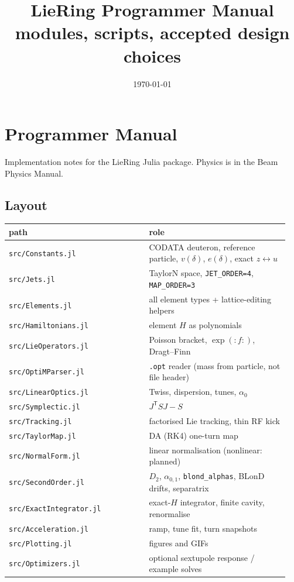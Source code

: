\documentclass[11pt,a4paper]{article}
\title{LieRing Programmer Manual\\\large modules, scripts, accepted design choices}
\date{\today}
\begin{document}
\maketitle
\tableofcontents
\clearpage
\section{Programmer Manual}

Implementation notes for the LieRing Julia package. Physics is in the
Beam Physics Manual.

\subsection{Layout}

\begin{center}\small\begin{tabular}{p{0.475\linewidth}p{0.475\linewidth}}\hline
\textbf{path} & \textbf{role}\\\hline
\texttt{src/Constants.jl} & CODATA deuteron, reference particle, $v(\delta)$, $e(\delta)$, exact $z\leftrightarrow u$\\
\texttt{src/Jets.jl} & TaylorN space, \texttt{JET\_ORDER=4}, \texttt{MAP\_ORDER=3}\\
\texttt{src/Elements.jl} & all element types + lattice-editing helpers\\
\texttt{src/Hamiltonians.jl} & element $H$ as polynomials\\
\texttt{src/LieOperators.jl} & Poisson bracket, $\exp(:f:)$, Dragt–Finn\\
\texttt{src/OptiMParser.jl} & \texttt{.opt} reader (mass from particle, not file header)\\
\texttt{src/LinearOptics.jl} & Twiss, dispersion, tunes, $\alpha_0$\\
\texttt{src/Symplectic.jl} & $J^\mathsf{T}SJ-S$\\
\texttt{src/Tracking.jl} & factorised Lie tracking, thin RF kick\\
\texttt{src/TaylorMap.jl} & DA (RK4) one-turn map\\
\texttt{src/NormalForm.jl} & linear normalisation (nonlinear: planned)\\
\texttt{src/SecondOrder.jl} & $D_2$, $\alpha_{0,1}$, \texttt{blond\_alphas}, BLonD drifts, separatrix\\
\texttt{src/ExactIntegrator.jl} & exact-$H$ integrator, finite cavity, renormalise\\
\texttt{src/Acceleration.jl} & ramp, tune fit, turn snapshots\\
\texttt{src/Plotting.jl} & figures and GIFs\\
\texttt{src/Optimizers.jl} & optional sextupole response / example solves\\
\hline\end{tabular}\end{center}
\end{document}
